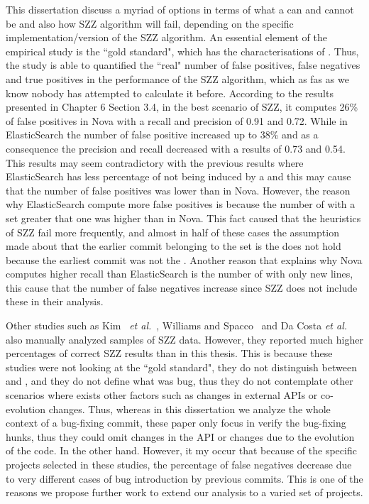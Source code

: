 \documentclass[a4paper, 12pt]{book}
\begin{document}
This dissertation discuss a myriad of options in terms of what a \BIC can and cannot be and also how SZZ algorithm will fail, depending on the specific implementation/version of the SZZ algorithm. An essential element of the empirical study is the ``gold standard", which has the characterisations of \BIC. Thus, the study is able to quantified the ``real" number of false positives, false negatives and true positives in the performance of the SZZ algorithm, which as fas as we know nobody has attempted to calculate it before. According to the results presented in Chapter 6 Section 3.4, in the best scenario of SZZ, it computes 26\% of false positives in Nova  with a recall and precision of 0.91 and 
0.72. While in ElasticSearch the number of false positive increased up to 38\% and as a consequence the precision and recall decreased with a results of 0.73 and 0.54. This results may seem contradictory with the previous results where ElasticSearch has less percentage of \BFC not being induced by a \BIC and this may cause that the number of false positives was lower than in Nova. However, the reason why ElasticSearch compute more false positives is because the number of \BFC with a \PC set greater that one was higher than in Nova. This fact caused that the heuristics of SZZ fail more frequently, and almost in half of these cases the assumption made about that the earlier commit belonging to the \PC set is the \BIC does not hold because the earliest commit was not the \BIC. Another reason that explains why Nova computes higher recall than ElasticSearch is the number of \BFC with only new lines, this cause that the number of false negatives increase since SZZ does not include these \BFC in their analysis.

Other studies such as Kim ~\emph{et al.}~\cite{kim2006automatic},  Williams and Spacco~\cite{williams2008szz} and Da Costa \emph{et al.} ~\cite{da2016framework} also manually analyzed samples of SZZ data. However, they reported much higher percentages of correct SZZ results than in this thesis. This is because these studies were not looking at the ``gold standard", they do not distinguish between \BIC and \FFC, and they do not define what was bug, thus they do not contemplate other scenarios where exists other factors such as changes in external APIs or co-evolution changes. Thus, whereas in this dissertation we analyze the whole context of a bug-fixing commit, these paper only focus in verify the bug-fixing hunks, thus they could omit changes in the API or changes due to the evolution of the code. In the other hand. However, it my occur that because of the specific projects selected in these studies, the percentage of false negatives decrease due to very different cases of bug introduction by previous commits. This is one of the reasons we propose further work to extend our analysis to a varied set of projects.
\end{document}
